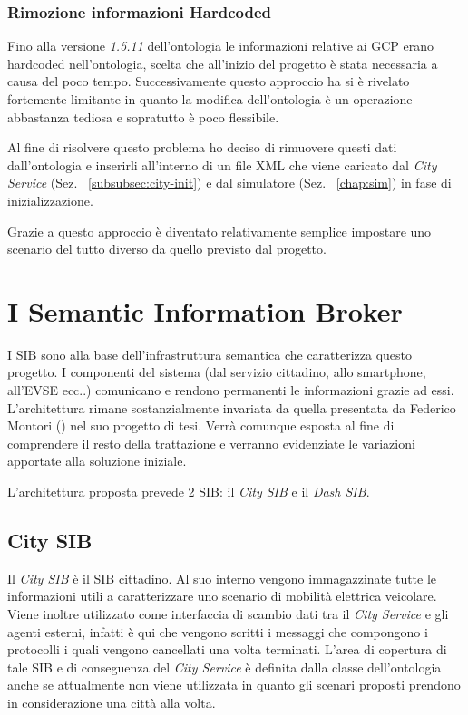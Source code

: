 \subsubsection{Rimozione informazioni Hardcoded}

Fino alla versione \emph{1.5.11} dell'ontologia le informazioni relative ai GCP erano hardcoded nell'ontologia, scelta che all'inizio del progetto è stata necessaria a causa del poco tempo. Successivamente questo approccio ha si è rivelato fortemente limitante in quanto la modifica dell'ontologia è un operazione abbastanza tediosa e sopratutto è poco flessibile. 

Al fine di risolvere questo problema ho deciso di rimuovere questi dati dall'ontologia e inserirli all'interno di un file XML che viene caricato dal \emph{City Service} (Sez. ~\ref{subsubsec:city-init}) e dal simulatore (Sez. ~\ref{chap:sim}) in fase di inizializzazione.

Grazie a questo approccio è diventato relativamente semplice impostare uno scenario del tutto diverso da quello previsto dal progetto.

\section{I Semantic Information Broker}

I SIB sono alla base dell'infrastruttura semantica che caratterizza questo progetto. I componenti del sistema (dal servizio cittadino, allo smartphone, all'EVSE ecc..) comunicano e rendono permanenti le informazioni grazie ad essi. L'architettura rimane sostanzialmente invariata da quella presentata da Federico Montori (\cite{montori2012}) nel suo progetto di tesi. Verrà comunque esposta al fine di comprendere il resto della trattazione e verranno evidenziate le variazioni apportate alla soluzione iniziale.

L'architettura proposta prevede 2 SIB: il \emph{City SIB} e il \emph{Dash SIB}.

\subsection{City SIB}\label{subsec:city-sib}

Il \emph{City SIB} è il SIB cittadino. Al suo interno vengono immagazzinate tutte le informazioni utili a caratterizzare uno scenario di mobilità elettrica veicolare. Viene inoltre utilizzato come interfaccia di scambio dati tra il \emph{City Service} e gli agenti esterni, infatti è qui che vengono scritti i messaggi che compongono i protocolli i quali vengono cancellati una volta terminati. L'area di copertura di tale SIB e di conseguenza del \emph{City Service} è definita dalla classe dell'ontologia  anche se attualmente non viene utilizzata in quanto gli scenari proposti prendono in considerazione una città alla volta.

